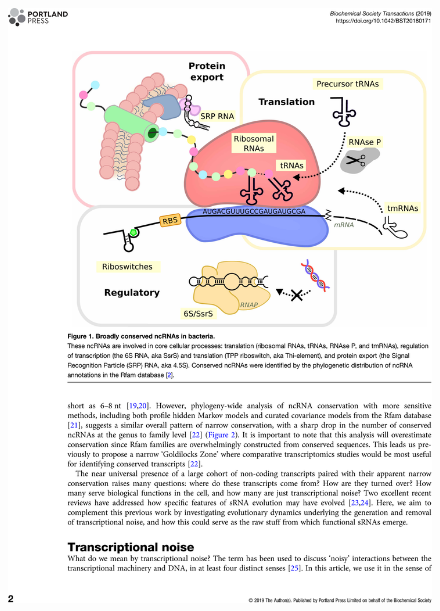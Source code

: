 \begin{figure}
    \centering
    \includegraphics[width=\linewidth]{lit_review/page2.png}
\end{figure}
